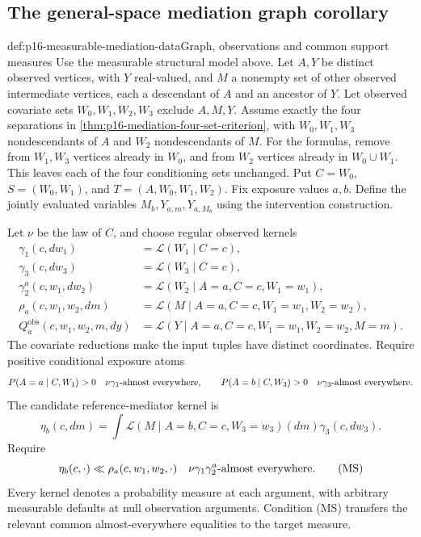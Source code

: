 \subsection{The general-space mediation graph corollary}

\begin{hbdefinition}{def:p16-measurable-mediation-data}{Graph, observations and common support measures}
Use the measurable structural model above. Let \(A,Y\) be distinct
observed vertices, with \(Y\) real-valued, and \(M\) a nonempty set of
other observed intermediate vertices, each a descendant of \(A\) and
an ancestor of \(Y\). Let observed covariate sets \(W_0,W_1,W_2,W_3\)
exclude \(A,M,Y\). Assume exactly the four separations in
\cref{thm:p16-mediation-four-set-criterion}, with
\(W_0,W_1,W_3\) nondescendants of \(A\) and \(W_2\) nondescendants
of \(M\). For the formulas, remove from \(W_1,W_3\) vertices already
in \(W_0\), and from \(W_2\) vertices already in \(W_0\cup W_1\).
This leaves each of the four conditioning sets unchanged. Put
\(C=W_0\), \(S=(W_0,W_1)\), and \(T=(A,W_0,W_1,W_2)\).
Fix exposure values \(a,b\). Define the jointly evaluated variables
\(M_b,Y_{a,m},Y_{a,M_b}\) using the intervention construction.

Let \(\nu\) be the law of \(C\), and choose regular observed kernels
\[
\begin{aligned}
 \gamma_1(c,dw_1)&=\mathcal L(W_1\mid C=c),\\
 \gamma_3(c,dw_3)&=\mathcal L(W_3\mid C=c),\\
 \gamma_2^a(c,w_1,dw_2)&=\mathcal L(W_2\mid A=a,C=c,W_1=w_1),\\
 \rho_a(c,w_1,w_2,dm)&=\mathcal L(M\mid A=a,C=c,W_1=w_1,W_2=w_2),\\
 Q^{\mathrm{obs}}_a(c,w_1,w_2,m,dy)
   &=\mathcal L(Y\mid A=a,C=c,W_1=w_1,W_2=w_2,M=m).
\end{aligned}
\]
The covariate reductions make the input tuples have distinct coordinates.
Require positive conditional exposure atoms
\[
 P(A=a\mid C,W_1)>0\quad\nu\gamma_1\hbox{-almost everywhere},
 \qquad P(A=b\mid C,W_3)>0\quad\nu\gamma_3\hbox{-almost everywhere}.
\]
The candidate reference-mediator kernel is
\[
 \eta_b(c,dm)=\int\mathcal L(M\mid A=b,C=c,W_3=w_3)(dm)
                                                    \gamma_3(c,dw_3).
\]
Require
\[
 \eta_b(c,\cdot)\ll\rho_a(c,w_1,w_2,\cdot)
 \quad \nu\gamma_1\gamma_2^a\hbox{-almost everywhere}.        \tag{MS}
\]
Every kernel denotes a probability measure at each argument, with arbitrary
measurable defaults at null observation arguments. Condition (MS) transfers
the relevant common almost-everywhere equalities to the target measure.
\end{hbdefinition}

